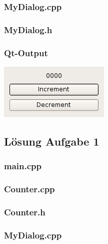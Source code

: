 \subsubsection{MyDialog.cpp}

\subsubsection{MyDialog.h}

\subsubsection{Qt-Output}
\begin{center}
	\includegraphics[scale=.5]{./images/u12a5.png}
\end{center}

\setcounter{section}{13}
\setcounter{subsection}{1}

\subsection{Lösung Aufgabe 1}
\subsubsection{main.cpp}

\subsubsection{Counter.cpp}

\subsubsection{Counter.h}

\subsubsection{MyDialog.cpp}

